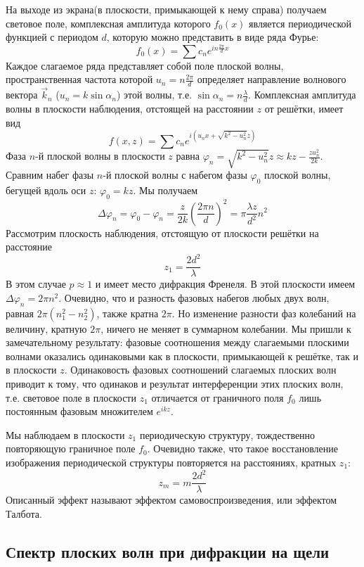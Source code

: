 На выходе из экрана(в плоскости, примыкающей к нему справа) получаем световое поле, комплексная амплитуда которого $f_0(x)$ является периодической функцией с периодом $d$, которую можно представить в виде ряда Фурье:
\[
f_0(x) = \sum c_n e^{in\frac{2\pi}{d}x}
\]
Каждое слагаемое ряда представляет собой поле плоской волны, пространственная частота которой $u_n = n\frac{2\pi}{d}$ определяет направление волнового вектора $\vec{k}_n$ ($u_n = k\sin\alpha_n$) этой волны, т.е. $\sin\alpha_n = n\frac{\lambda}{d}$. Комплексная амплитуда волны в плоскости наблюдения, отстоящей на расстоянии $z$  от решётки, имеет вид
\[
f(x, z) = \sum c_ne^{i(u_nx + \sqrt{k ^ 2 - u_n^2}z)}
\]
Фаза $n$-й  плоской волны в плоскости $z$  равна $\varphi_n = \sqrt{k^2 - u_n^2}z \approx kz - \frac{zu_n^2}{2k}$. Сравним набег фазы $n$-й плоской волны с набегом фазы $\varphi_0$ плоской волны, бегущей вдоль оси $z$: $\varphi_0 = kz$. Мы получаем
\[
\Delta\varphi_n = \varphi_0 - \varphi_n = \frac{z}{2k}\left(\frac{2\pi n}{d}\right)^2 = \pi \frac{\lambda z}{d^2} n^2
\]
Рассмотрим плоскость наблюдения, отстоящую от плоскости решётки на расстояние
\[
    z_1 = \frac{2d^2}{\lambda}
\]
В этом случае $p \approx 1$ и имеет место дифракция Френеля. В этой плоскости имеем $\Delta \varphi_n = 2\pi n^2$. Очевидно, что и разность фазовых набегов любых двух волн, равная $2\pi(n_1^2 - n_2^2)$, также кратна $2\pi$. Но изменение разности фаз колебаний на величину, кратную $2\pi$, ничего не меняет в суммарном колебании. Мы пришли к замечательному результату: фазовые соотношения между слагаемыми плоскими волнами оказались одинаковыми как в плоскости, примыкающей к решётке, так и в плоскости $z$. Одинаковость фазовых соотношений слагаемых плоских волн приводит к тому, что одинаков и результат интерференции этих плоских волн, т.е. световое поле в плоскости $z_1$ отличается от граничного поля $f_0$ лишь постоянным фазовым множителем $e^{ikz}$.

Мы наблюдаем в плоскости $z_1$  периодическую структуру, тождественно повторяющую граничное поле $f_0$. Очевидно также, что такое восстановление изображения периодической структуры повторяется на расстояниях, кратных $z_1$:
\[
z_m = m\frac{2d^2}{\lambda}
\]
Описанный эффект называют эффектом самовоспроизведения, или эффектом Талбота.

\subsection{Спектр плоских волн при дифракции на щели}

\begin{figure}[ht!]
\end{figure}

